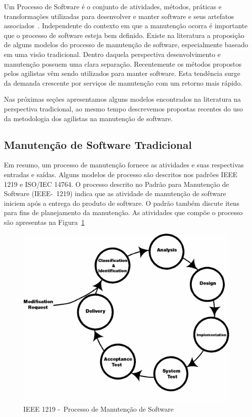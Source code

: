Um Processo de Software é o conjunto de atividades, métodos, práticas e
transformações utilizadas para desenvolver e manter software e seus
artefatos associados~\cite{paulk1993key}.  Independente do contexto em que a
manutenção ocorra é importante que o processo de software esteja
bem definido. Existe na literatura a proposição de alguns modelos do processo de manutenção de
software, especialmente baseado em uma visão tradicional. Dentro daquela perspectiva desenvolvimento
e manutenção possuem uma clara separação. Recentemente os métodos propostos pelos agilistas vêm sendo
utilizados para manter software. Esta tendência surge da demanda crescente por serviços de
manutenção com um retorno mais rápido. 

Nas próximas seções apresentamos alguns modelos encontrados na literatura na perspectiva
tradicional, ao mesmo tempo descrevemos propostas recentes do uso da metodologia dos agilistas na
manutenção de software. 

\subsection{Manutenção de Software Tradicional}
\label{subsec:manutenção_de_software_tradicional}

Em resumo, um processo de manutenção fornece as atividades e suas respectivas entradas e saídas.
Alguns modelos de processo são descritos nos padrões IEEE 1219 e ISO/IEC 14764. O processo descrito
no Padrão para Manutenção de Software (IEEE-~1219) indica que as atividade de manutenção de software
iniciem após a entrega do produto de software. O padrão também discute itens para fins de
planejamento da manutenção. As atividades que compõe o processo são apresentas na
Figura~\ref{fig:ieee-1219-processo-man-software}

\begin{figure}[htpb]
	\centering
	\includegraphics[width=0.8\linewidth]{chapter-manutencao-software-visao-geral/img/ieee-1219-98-processo-manutencao.png}
	\caption{IEEE 1219 -~Processo de Manutenção de Software}
	\label{fig:ieee-1219-processo-man-software}
\end{figure}

